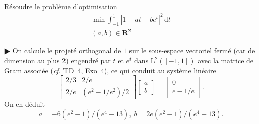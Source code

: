 \documentclass[11pt,a4paper]{article}
\def\R{\mathbf{R}}
\def\L{\mathrm{L}}
\def\d{\mathrm{d}}
\def\cf{\emph{cf.}}
\theoremstyle{plain}
\theoremstyle{definition}
\begin{document}
\begin{Exercice}[4 points]
R\'esoudre le probl\`eme d'optimisation
\[ \begin{array}{l}
  \min \int_{-1}^1 |1-at-b e^t|^2\,\d t\\
  (a,b) \in \R^2
\end{array} \]

\begin{corr} $\RHD$ On calcule le projet\'e orthogonal de
$1$ sur le sous-espace vectoriel ferm\'e (car de dimension au plus $2$) engendr\'e par
$t$ et $e^t$ dans $\L^2([-1,1])$ avec la matrice de Gram associ\'ee (\cf{} TD~4, Exo~4),
ce qui conduit au syst\`eme lin\'eaire
\[ \left[ \begin{array}{cc} 2/3 & 2/e\\ 2/e & (e^2-1/e^2)/2 \end{array} \right]
   \left[ \begin{array}{c} a\\ b \end{array} \right] = 
   \left[ \begin{array}{c} 0\\ e-1/e \end{array} \right]. \]
On en d\'eduit
\[ a=-6(e^2-1)/(e^4-13),\ b=2e(e^2-1)/(e^4-13). \]
\end{corr}

\end{Exercice} \vspace*{1em}
\end{document}
